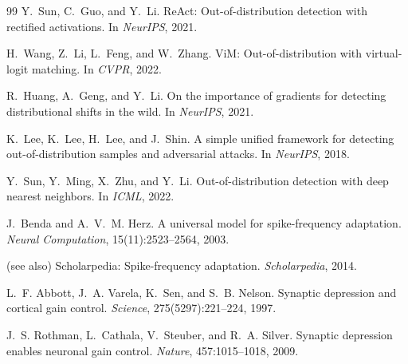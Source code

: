 \begin{thebibliography}{99}
Y.~Sun, C.~Guo, and Y.~Li.
\newblock ReAct: Out-of-distribution detection with rectified activations.
\newblock In \emph{NeurIPS}, 2021.

H.~Wang, Z.~Li, L.~Feng, and W.~Zhang.
\newblock ViM: Out-of-distribution with virtual-logit matching.
\newblock In \emph{CVPR}, 2022.

R.~Huang, A.~Geng, and Y.~Li.
\newblock On the importance of gradients for detecting distributional shifts in the wild.
\newblock In \emph{NeurIPS}, 2021.

K.~Lee, K.~Lee, H.~Lee, and J.~Shin.
\newblock A simple unified framework for detecting out-of-distribution samples and adversarial
  attacks.
\newblock In \emph{NeurIPS}, 2018.

Y.~Sun, Y.~Ming, X.~Zhu, and Y.~Li.
\newblock Out-of-distribution detection with deep nearest neighbors.
\newblock In \emph{ICML}, 2022.

J.~Benda and A.~V.~M. Herz.
\newblock A universal model for spike-frequency adaptation.
\newblock \emph{Neural Computation}, 15(11):2523--2564, 2003.

(see also) Scholarpedia: Spike-frequency adaptation.
\newblock \emph{Scholarpedia}, 2014.

L.~F. Abbott, J.~A. Varela, K.~Sen, and S.~B. Nelson.
\newblock Synaptic depression and cortical gain control.
\newblock \emph{Science}, 275(5297):221--224, 1997.

J.~S. Rothman, L.~Cathala, V.~Steuber, and R.~A. Silver.
\newblock Synaptic depression enables neuronal gain control.
\newblock \emph{Nature}, 457:1015--1018, 2009.

\end{thebibliography}
